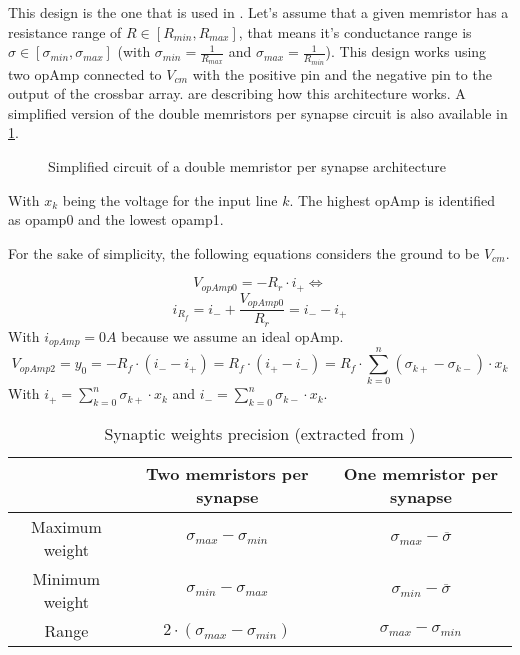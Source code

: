 This design is the one that is used in \cite{doubleMem}. Let's assume that a given memristor has a resistance range of $R\in[R_{min},R_{max}]$, that means it's conductance range is $\sigma \in [\sigma_{min},\sigma_{max}]$ (with $\sigma_{min}= \frac{1}{R_{max}}$ and $\sigma_{max}= \frac{1}{R_{min}}$). This design works using two \ac{opAmp} connected to $V_{cm}$ with the positive pin and the negative pin to the output of the crossbar array.  are describing how this architecture works. A simplified version of the double memristors per synapse circuit is also available in \cref{circt:doubleMem}.

\begin{figure}[H]
  \centering
  
  \caption{Simplified circuit of a double memristor per synapse architecture}
  \label{circt:doubleMem}
\end{figure}

With $x_k$ being the voltage for the input line $k$. The highest \ac{opAmp} is identified as opamp0 and the lowest opamp1.

For the sake of simplicity, the following equations considers the ground to be $V_{cm}$.

\begin{equation}
  \label{eq:doubleMem0}
  V_{opAmp0}=-R_r\cdot i_+ \Leftrightarrow
\end{equation}
\begin{equation}
  \label{eq:doubleMem1}
  i_{R_f}=i_-+\frac{V_{opAmp0}}{R_r}=i_--i_+
\end{equation}
With $i_{opAmp}=0A$ because we assume an ideal \ac{opAmp}.
\begin{equation}
  \label{eq:doubleMem2}
  V_{opAmp2}=y_0=-R_f\cdot(i_--i_+)=R_f\cdot(i_+-i_-)=R_f\cdot\sum_{k=0}^n(\sigma_{k+}-\sigma_{k-})\cdot x_k
\end{equation}
With $i_+=\sum_{k=0}^n\sigma_{k+}\cdot x_k$ and $i_-=\sum_{k=0}^n\sigma_{k-}\cdot x_k$.


\begin{table}[H]
  \centering
  \begin{tabular}{|c|c|c|}
    \cline{2-3}
    \rowcolor{gray}
    \multicolumn{1}{c|}{\cellcolor[HTML]{FFFFFF}} & Two memristors per synapse & One memristor per synapse \\
    \hline
    Maximum weight & $\sigma_{max}-\sigma_{min}$ & $\sigma_{max} -\overline{\sigma}$\\
    \hline
    Minimum weight & $\sigma_{min}-\sigma_{max}$ & $\sigma_{min} -\overline{\sigma}$\\
    \hline
    Range & $2\cdot(\sigma_{max}-\sigma_{min})$&$\sigma_{max}-\sigma_{min}$\\
    \hline
  \end{tabular}
  \caption{Synaptic weights precision (extracted from \cite{doubleMem})}
  \label{tab:synapses}
\end{table}

